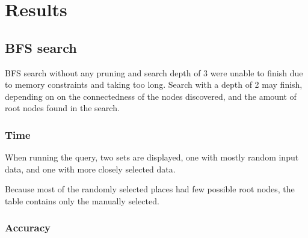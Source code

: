 
\chapter{Results}
\section{BFS search}
BFS search without any pruning and search depth of 3 were unable to finish due to memory constraints and taking too long. Search with a depth of 2 may finish, depending on on the connectedness of the nodes discovered, and the amount of root nodes found in the search.

\subsection{Time}
When running the query, two sets are displayed, one with mostly random input data, and one with more closely selected data.

Because most of the randomly selected places had few possible root nodes, the table contains only the manually selected.


\subsection{Accuracy}

\clearpage